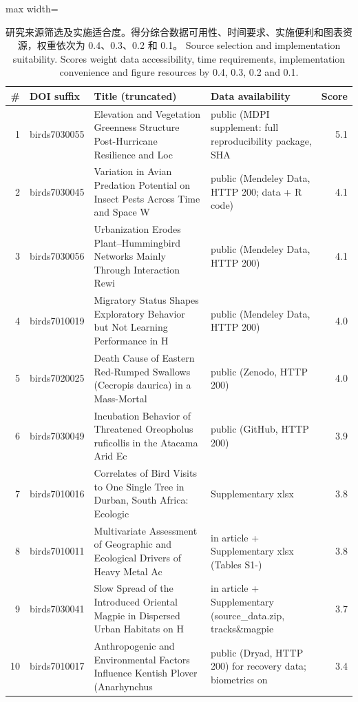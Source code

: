 \begin{table}[htbp]\centering\footnotesize
\caption{\ifzh
研究来源筛选及实施适合度。得分综合数据可用性、时间要求、实施便利和图表资源，权重依次为 0.4、0.3、0.2 和 0.1。
\else
Source selection and implementation suitability. Scores weight data accessibility, time requirements, implementation convenience and figure resources by 0.4, 0.3, 0.2 and 0.1.
\fi}\label{tab:screen}
\begin{adjustbox}{max width=\linewidth}
\begin{tabular}{rl>{\raggedright\arraybackslash}p{5.4cm}>{\raggedright\arraybackslash}p{4.2cm}r}\toprule
\# & DOI suffix & Title (truncated) & Data availability & Score \\ \midrule
1 & birds7030055 & Elevation and Vegetation Greenness Structure Post-Hurricane Resilience and Loc & public (MDPI supplement: full reproducibility package, SHA & 5.1 \\
2 & birds7030045 & Variation in Avian Predation Potential on Insect Pests Across Time and Space W & public (Mendeley Data, HTTP 200; data + R code) & 4.1 \\
3 & birds7030056 & Urbanization Erodes Plant–Hummingbird Networks Mainly Through Interaction Rewi & public (Mendeley Data, HTTP 200) & 4.1 \\
4 & birds7010019 & Migratory Status Shapes Exploratory Behavior but Not Learning Performance in H & public (Mendeley Data, HTTP 200) & 4.0 \\
5 & birds7020025 & Death Cause of Eastern Red-Rumped Swallows (Cecropis daurica) in a Mass-Mortal & public (Zenodo, HTTP 200) & 4.0 \\
6 & birds7030049 & Incubation Behavior of Threatened Oreopholus ruficollis in the Atacama Arid Ec & public (GitHub, HTTP 200) & 3.9 \\
7 & birds7010016 & Correlates of Bird Visits to One Single Tree in Durban, South Africa: Ecologic & Supplementary xlsx & 3.8 \\
8 & birds7010011 & Multivariate Assessment of Geographic and Ecological Drivers of Heavy Metal Ac & in article + Supplementary xlsx (Tables S1-) & 3.8 \\
9 & birds7030041 & Slow Spread of the Introduced Oriental Magpie in Dispersed Urban Habitats on H & in article + Supplementary (source\_data.zip, tracks\&magpie & 3.7 \\
10 & birds7010017 & Anthropogenic and Environmental Factors Influence Kentish Plover (Anarhynchus  & public (Dryad, HTTP 200) for recovery data; biometrics on  & 3.4 \\
\bottomrule\end{tabular}
\end{adjustbox}\end{table}